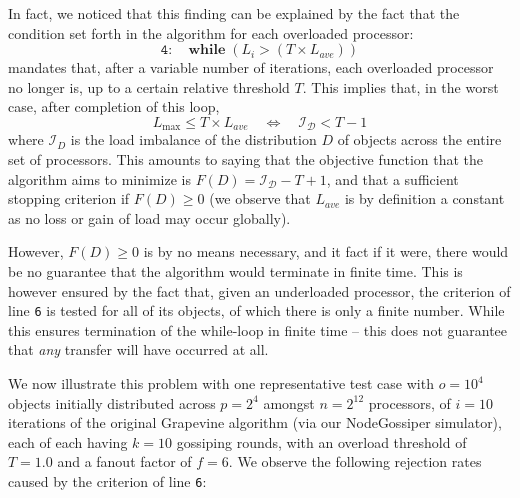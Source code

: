 In fact, we noticed that this finding can be explained by the fact
that the condition set forth in the algorithm for each overloaded
processor:
\[
\mathtt{4:} \quad \mathrm{\mathbf{while}} \; (L_i > (T \times L_{ave}))
\]
mandates that, after a variable number of iterations, each overloaded
processor no longer is, up to a certain relative threshold $T$.
This implies that, in the worst case, after completion of this loop,
\[
\label{eq:imbalance}
L_{\max} \le T \times L_{ave}
\quad \Longleftrightarrow \quad
\mathcal{I_D} < T - 1
\]
where $\mathcal{I}_D$ is the load imbalance of the distribution $D$ of
objects across the entire set of processors. This amounts to
saying that the objective function that the algorithm aims to minimize
is $F(D)=\mathcal{I_D}-T+1$, and that a sufficient stopping criterion
if $F(D)\ge0$ (we observe that $L_{ave}$ is by definition a constant
as no loss or gain of load may occur globally). 

However, $F(D)\ge0$ is by no means necessary, and it fact if it were,
there would be no guarantee that the algorithm would terminate in
finite time. This is however ensured by the fact that, given an
underloaded processor, the criterion of line \texttt{6} is tested for
all of its objects, of which there is only a finite number.
While this ensures termination of the while-loop in finite time --
this does not guarantee that \emph{any} transfer will have occurred at
all.

We now illustrate this problem with one representative test case
with $o=10^4$ objects initially distributed across $p=2^4$
amongst $n=2^{12}$ processors, of $i=10$ iterations of the original
Grapevine algorithm (via our \textsf{NodeGossiper} simulator), each of
each having $k=10$ gossiping rounds, with an overload threshold of
$T=1.0$ and a fanout factor of $f=6$.
We observe the following rejection rates caused by the criterion of line \texttt{6}:

